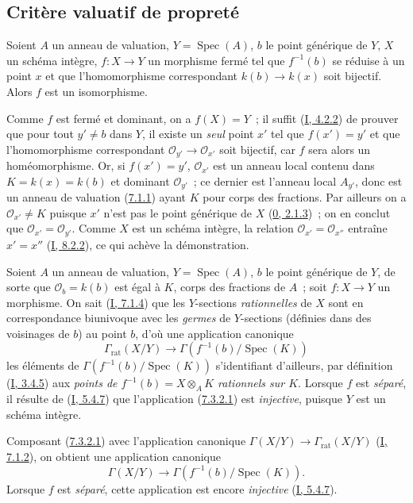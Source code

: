 \subsection{Critère valuatif de propreté}
\label{subsection:II.7.3-fr}

\begin{proposition}[7.3.1]
\label{II.7.3.1-fr}
Soient $A$ un anneau de valuation, $Y=\operatorname{Spec}(A)$, $b$ le point
générique de $Y$, $X$ un schéma intègre, $f:X\to Y$ un morphisme fermé tel
que $f^{-1}(b)$ se réduise à un point $x$ et que l'homomorphisme correspondant
$k(b)\to k(x)$ soit bijectif. Alors $f$ est un isomorphisme.
\end{proposition}

Comme $f$ est fermé et dominant, on a $f(X)=Y$~; il suffit
(\hyperref[I.4.2.2-fr]{I, 4.2.2}) de prouver que pour tout $y'\neq b$ dans $Y$,
il existe un \emph{seul} point $x'$ tel que $f(x')=y'$ et que l'homomorphisme
correspondant $\mathcal{O}_{y'}\to\mathcal{O}_{x'}$ soit bijectif, car $f$ sera
alors un homéomorphisme. Or, si $f(x')=y'$, $\mathcal{O}_{x'}$ est un anneau
local contenu dans $K=k(x)=k(b)$ et dominant $\mathcal{O}_{y'}$~; ce dernier
est l'anneau local $A_{y'}$, donc est un anneau de valuation
(\hyperref[II.7.1.1-fr]{7.1.1}) ayant $K$ pour corps des fractions. Par
ailleurs on a $\mathcal{O}_{x'}\neq K$ puisque $x'$ n'est pas le point
générique de $X$ (\hyperref[0.2.1.3-fr]{0, 2.1.3})~; on en conclut que
$\mathcal{O}_{x'}=\mathcal{O}_{y'}$. Comme $X$ est un schéma intègre, la
relation $\mathcal{O}_{x'}=\mathcal{O}_{x''}$ entraîne $x'=x''$
(\hyperref[I.8.2.2-fr]{I, 8.2.2}), ce qui achève la démonstration.

\begin{env}[7.3.2]
\label{II.7.3.2-fr}
Soient $A$ un anneau de valuation, $Y=\operatorname{Spec}(A)$, $b$ le point
générique de $Y$, de sorte que $\mathcal{O}_b=k(b)$ est égal à $K$, corps des
fractions de $A$~; soit $f:X\to Y$ un morphisme. On sait
(\hyperref[I.7.1.4-fr]{I, 7.1.4}) que les $Y$-sections \emph{rationnelles} de
$X$ sont en correspondance biunivoque avec les \emph{germes} de $Y$-sections
(définies dans des voisinages de $b$) au point $b$, d'où une application
canonique
\[
\tag{7.3.2.1}
\label{II.7.3.2.1-fr}
\Gamma_{\mathrm{rat}}(X/Y)\longrightarrow
\Gamma(f^{-1}(b)/\operatorname{Spec}(K))
\]
les éléments de $\Gamma(f^{-1}(b)/\operatorname{Spec}(K))$ s'identifiant
d'ailleurs, par définition (\hyperref[I.3.4.5-fr]{I, 3.4.5}) aux \emph{points
de $f^{-1}(b)=X\otimes_AK$ rationnels sur $K$}. Lorsque $f$ est \emph{séparé},
il résulte de (\hyperref[I.5.4.7-fr]{I, 5.4.7}) que l'application
(\hyperref[II.7.3.2.1-fr]{7.3.2.1}) est \emph{injective}, puisque $Y$ est un
schéma intègre.

Composant (\hyperref[II.7.3.2.1-fr]{7.3.2.1}) avec l'application canonique
$\Gamma(X/Y)\to\Gamma_{\mathrm{rat}}(X/Y)$
(\hyperref[I.7.1.2-fr]{I, 7.1.2}), on obtient une application canonique
\[
\tag{7.3.2.2}
\label{II.7.3.2.2-fr}
\Gamma(X/Y)\longrightarrow \Gamma(f^{-1}(b)/\operatorname{Spec}(K)).
\]
Lorsque $f$ est \emph{séparé}, cette application est encore \emph{injective}
(\hyperref[I.5.4.7-fr]{I, 5.4.7}).
\end{env}

